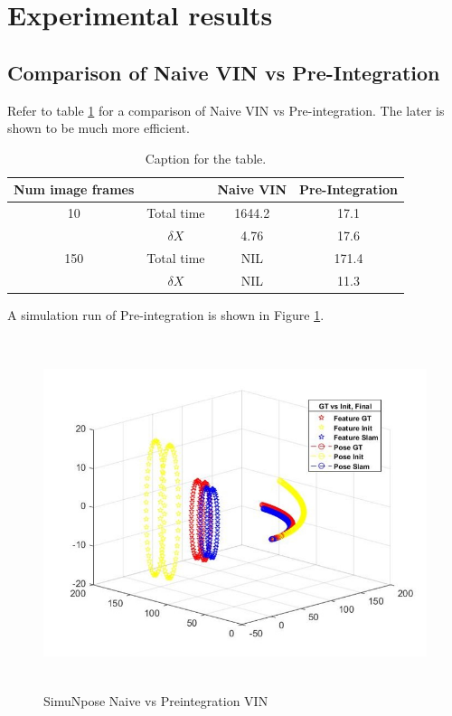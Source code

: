 \documentclass[12pt]{article}   %
\begin{document}
\section{Experimental results}
\subsection{Comparison of Naive VIN vs Pre-Integration}
Refer to table \ref{tab:table1} for a comparison of Naive VIN vs Pre-integration. The later is shown to be much more efficient.
\begin{table}[h!]
	\centering
	\caption{Caption for the table.}
	\label{tab:table1}
	\begin{tabular}{cc|c|c}
		Num image frames &  & Naive VIN & Pre-Integration\\
		\hline
		10 & Total time & 1644.2 & 17.1\\
		{} & $\delta X$ & 4.76 & 17.6\\

		\hline
		150 & Total time & NIL & 171.4\\
		{} & $\delta X$ & NIL & 11.3\\		
	\end{tabular}
\end{table}

A simulation run of Pre-integration is shown in Figure \ref{fig:simuNpose}. \\
\begin{figure}[ht]
	\label{fig:simuNpose}
	\includegraphics[height=10.3cm]{figures/SimuNpose_simData.jpg}
	\caption{SimuNpose Naive vs Preintegration VIN}
\end{figure}
\end{document}

